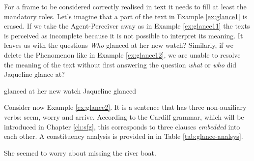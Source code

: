 For a frame to be considered correctly realised in text it needs to fill at least the mandatory roles. Let's imagine that a part of the text in Example \ref{ex:glance1} is erased. If we take the Agent-Perceiver away as in Example \ref{ex:glance11} the texts is perceived as incomplete because it is not possible to interpret its meaning. It leaves us with the questions \textit{Who} glanced at her new watch? Similarly, if we delete the Phenomenon like in Example \ref{ex:glance12}, we are unable to resolve the meaning of the text without first answering the question \textit{what} or \textit{who} did Jaqueline glance at?

\begin{exe}
    \ex\label{ex:glance11} glanced at her new watch
    \ex\label{ex:glance12} Jaqueline glanced
\end{exe}

Consider now Example \ref{ex:glance2}. It is a sentence that has three non-auxiliary verbs: seem, worry and arrive. According to the Cardiff grammar, which will be introduced in Chapter \ref{ch:sfg}, this corresponds to three clauses \textit{embedded} into each other. A constituency analysis is provided in in Table \ref{tab:glance-analsys}.

\begin{exe}
    \ex\label{ex:glance2} She seemed to worry about missing the river boat.
\end{exe}

